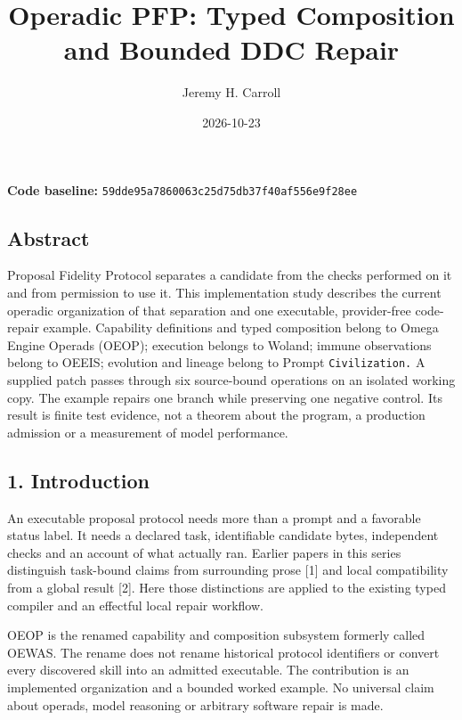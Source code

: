\documentclass[
  11pt,
]{article}
\title{Operadic PFP: Typed Composition and Bounded DDC Repair}
\author{Jeremy H. Carroll}
\date{2026-10-23}
\begin{document}
\makeatletter
\begin{center}
{\LARGE \@title\par}
\vspace{0.8em}
{\normalsize \@author\par}
\vspace{0.5em}
{\small \@date\par}
\end{center}
\makeatother

\textbf{Code baseline:}
\nolinkurl{59dde95a7860063c25d75db37f40af556e9f28ee}

\subsection{Abstract}\label{abstract}

Proposal Fidelity Protocol separates a candidate from the checks
performed on it and from permission to use it. This implementation study
describes the current operadic organization of that separation and one
executable, provider-free code-repair example. Capability definitions
and typed composition belong to Omega Engine Operads (OEOP); execution
belongs to Woland; immune observations belong to OEEIS; evolution and
lineage belong to Prompt \nolinkurl{Civilization.} A supplied patch
passes through six source-bound operations on an isolated working copy.
The example repairs one branch while preserving one negative control.
Its result is finite test evidence, not a theorem about the program, a
production admission or a measurement of model performance.

\subsection{1. Introduction}\label{introduction}

An executable proposal protocol needs more than a prompt and a favorable
status label. It needs a declared task, identifiable candidate bytes,
independent checks and an account of what actually ran. Earlier papers
in this series distinguish task-bound claims from surrounding prose
{[}1{]} and local compatibility from a global result {[}2{]}. Here those
distinctions are applied to the existing typed compiler and an effectful
local repair workflow.

OEOP is the renamed capability and composition subsystem formerly called
OEWAS. The rename does not rename historical protocol identifiers or
convert every discovered skill into an admitted executable. The
contribution is an implemented organization and a bounded worked
example. No universal claim about operads, model reasoning or arbitrary
software repair is made.
\end{document}
